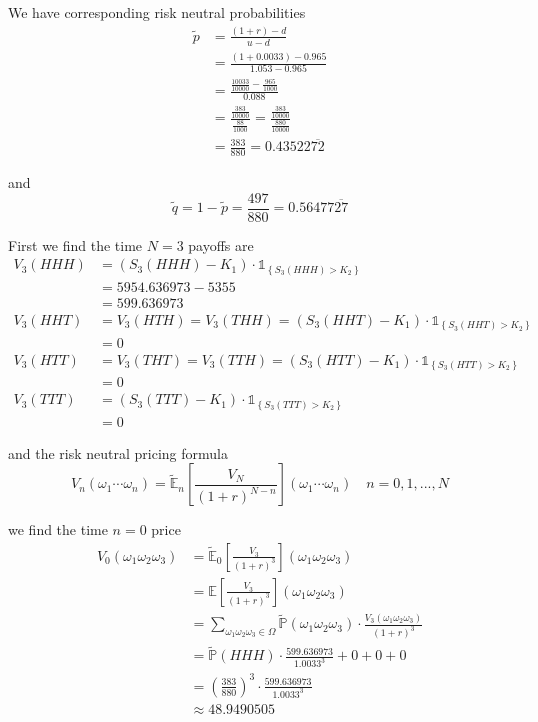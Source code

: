 \documentclass[12pt]{article}
\renewcommand{\P}{\mathbb P}
\newcommand{\E}{\mathbb E}
\begin{document}
We have corresponding risk neutral probabilities
\begin{align*}
	\tilde{p} &= \frac{(1 + r) - d}{u - d} \\
	&= \frac{(1 + 0.0033) - 0.965}{1.053 - 0.965}\\
	&= \frac{ \frac{10033}{10000} - \frac{965}{1000} }{ 0.088 } \\
	&= \frac{ \frac{ 383 }{ 10000 } }{ \frac{88}{1000} } = \frac{ \frac{ 383 }{ 10000 } }{ \frac{ 880 }{10000} }  \\
	&= \frac{383}{ 880 } = 0.43522\overline{72}
\end{align*}

and
\begin{equation*}
	\tilde{q} = 1 - \tilde{p} = \frac{497}{880} = 0.56477\overline{27}
\end{equation*}

First we find the time $N = 3$ payoffs are
\begin{align*}
	V_3(HHH) &= (S_3(HHH) - K_1) \cdot \mathds 1_{\left\{ S_3(HHH) > K_2 \right\} } \\
	&= 5954.636973 - 5355 \\
	&= 599.636973 \\
	V_3(HHT) &= V_3(HTH) = V_3(THH) = (S_3(HHT) - K_1) \cdot \mathds 1_{\left\{ S_3(HHT) > K_2 \right\} } \\
	&= 0 \\
	V_3(HTT) &= V_3(THT) = V_3(TTH) =  (S_3(HTT) - K_1) \cdot \mathds 1_{\left\{ S_3(HTT) > K_2 \right\} } \\
	&= 0 \\
	V_3(TTT) &=  (S_3(TTT) - K_1) \cdot \mathds 1_{\left\{ S_3(TTT) > K_2 \right\} } \\
	&= 0
\end{align*}

and  the risk neutral pricing formula
\begin{equation*}
	V_n(\omega_1\cdots\omega_n) = \tilde{\E}_n \left[ \frac{V_N}{(1 + r)^{N - n}} \right] (\omega_1\cdots\omega_n) \quad n = 0, 1, ..., N
\end{equation*}

we find the time $n = 0$ price
\begin{align*}
	V_0(\omega_1\omega_2\omega_3) &= \tilde{\E}_0 \left[ \frac{V_3}{(1 + r)^{3}} \right] (\omega_1\omega_2\omega_3) \\
	&= \E \left[ \frac{V_3}{(1 + r)^{3}} \right](\omega_1\omega_2\omega_3) \\
	&= \sum_{\omega_1\omega_2\omega_3 \in \Omega} \tilde{\P}(\omega_1\omega_2\omega_3) \cdot \frac{V_3(\omega_1\omega_2\omega_3)}{(1 + r)^{3}} \\
	&= \tilde{\P}(HHH) \cdot \frac{599.636973}{1.0033^3} + 0 + 0 + 0 \\
	&= \left( \frac{383}{880} \right)^3 \cdot \frac{599.636973}{1.0033^3} \\
	&\approx 48.9490505
\end{align*}
\end{document}
